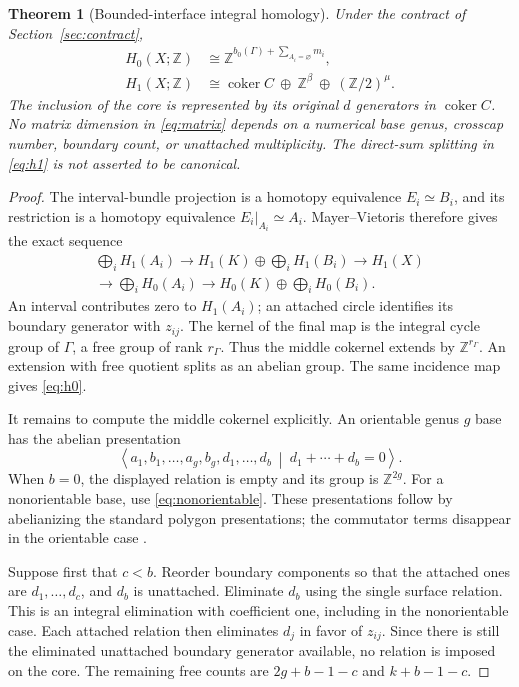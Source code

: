 \documentclass[11pt]{article}
\newtheorem{theorem}{Theorem}[section]
\theoremstyle{definition}
\theoremstyle{remark}
\newcommand{\Z}{\mathbb Z}
\newcommand{\coker}{\operatorname{coker}}
\begin{document}
\begin{theorem}[Bounded-interface integral homology]
\label{thm:condensation}
Under the contract of Section~\ref{sec:contract},
\begin{align}
 H_0(X;\Z)&\cong\Z^{b_0(\Gamma)+\sum_{A_i=\varnothing}m_i},
 \label{eq:h0}\\
 H_1(X;\Z)&\cong\coker C\ \oplus\ \Z^\beta\ \oplus\ (\Z/2)^\mu.
 \label{eq:h1}
\end{align}
The inclusion of the core is represented by its original $d$ generators in
$\coker C$. No matrix dimension in \eqref{eq:matrix} depends on a numerical
base genus, crosscap number, boundary count, or unattached multiplicity.
The direct-sum splitting in \eqref{eq:h1} is not asserted to be canonical.
\end{theorem}

\begin{proof}
The interval-bundle projection is a homotopy equivalence $E_i\simeq B_i$,
and its restriction is a homotopy equivalence $E_i|_{A_i}\simeq A_i$.
Mayer--Vietoris therefore gives the exact sequence
\begin{multline}
 \bigoplus_i H_1(A_i)\longrightarrow
 H_1(K)\oplus\bigoplus_i H_1(B_i)
 \longrightarrow H_1(X)\\
 \longrightarrow\bigoplus_i H_0(A_i)
 \longrightarrow H_0(K)\oplus\bigoplus_i H_0(B_i).
 \label{eq:mv}
\end{multline}
An interval contributes zero to $H_1(A_i)$; an attached circle identifies its
boundary generator with $z_{ij}$. The kernel of the final map is the integral
cycle group of $\Gamma$, a free group of rank $r_\Gamma$. Thus the middle
cokernel extends by $\Z^{r_\Gamma}$. An extension with free quotient splits
as an abelian group. The same incidence map gives \eqref{eq:h0}.

It remains to compute the middle cokernel explicitly. An orientable genus
$g$ base has the abelian presentation
\[
 \left\langle a_1,b_1,\ldots,a_g,b_g,d_1,\ldots,d_b
 \ \middle|\ d_1+\cdots+d_b=0\right\rangle.
\]
When $b=0$, the displayed relation is empty and its group is $\Z^{2g}$.
For a nonorientable base, use \eqref{eq:nonorientable}. These presentations
follow by abelianizing the standard polygon presentations; the commutator
terms disappear in the orientable case \cite{hatcher}.

Suppose first that $c<b$. Reorder boundary components so that the attached
ones are $d_1,\ldots,d_c$, and $d_b$ is unattached. Eliminate $d_b$ using the
single surface relation. This is an integral elimination with coefficient
one, including in the nonorientable case. Each attached relation then
eliminates $d_j$ in favor of $z_{ij}$. Since there is still the eliminated
unattached boundary generator available, no relation is imposed on the core.
The remaining free counts are $2g+b-1-c$ and $k+b-1-c$.


\end{proof}
\end{document}
